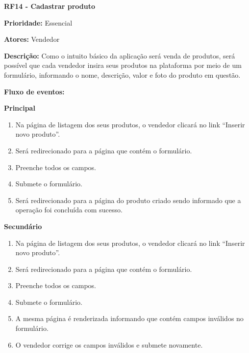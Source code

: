 \begin{apendicesenv}
\textbf{RF14 - Cadastrar produto} \par
\textbf{Prioridade:} Essencial \par
\textbf{Atores:} Vendedor \par
\textbf{Descrição:} Como o intuito básico da aplicação será venda de produtos, será possível que cada vendedor insira seus produtos na plataforma por meio de um formulário, informando o nome, descrição, valor e foto do produto em questão. \par
\textbf{Fluxo de eventos:} \par
\textbf{Principal} \par
\begin{enumerate}
  \item Na página de listagem dos seus produtos, o vendedor clicará no link “Inserir novo produto”.
  \item Será redirecionado para a página que contém o formulário.
  \item Preenche todos os campos.
  \item Submete o formulário.
  \item Será redirecionado para a página do produto criado sendo informado que a operação foi concluída com sucesso.
\end{enumerate} \par
\textbf{Secundário} \par
\begin{enumerate}
  \item Na página de listagem dos seus produtos, o vendedor clicará no link “Inserir novo produto”.
  \item Será redirecionado para a página que contém o formulário.
  \item Preenche todos os campos.
  \item Submete o formulário.
  \item A mesma página é renderizada informando que contém campos inválidos no formulário.
  \item O vendedor corrige os campos inválidos e submete novamente.
\end{enumerate}


\end{apendicesenv}
